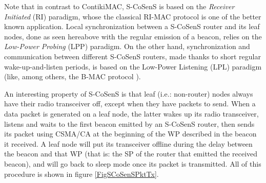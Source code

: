\documentclass[12pt,a4paper]{article}
\begin{document}
Note that in contrast to ContikiMAC, S-CoSenS is based on the \emph{Receiver
Initiated} (RI) paradigm, whose the classical RI-MAC protocol \cite{RIMAC}
is one of the better known application.
Local synchronization between a S-CoSenS router and its leaf nodes, done
as seen hereabove with the regular emission of a beacon, relies on the
\emph{Low-Power Probing} (LPP) paradigm.
On the other hand, synchronization and communication between different
S-CoSenS routers, made thanks to short regular wake-up-and-listen periods,
is based on the Low-Power Listening (LPL) paradigm (like, among others,
the B-MAC protocol \cite{BMAC}).

An interesting property of S-CoSenS is that leaf (i.e.: non-router) nodes
always have their radio transceiver off, except when they have packets
to send. When a data packet is generated on a leaf node, the latter wakes up
its radio transceiver, listens and waits to the first beacon emitted by
an S-CoSenS router, then sends its packet using CSMA/CA at the beginning
of the WP described in the beacon it received. A leaf node will put its
transceiver offline during the delay between the beacon and that WP
(that is: the SP of the router that emitted the received beacon), and
will go back to sleep mode once its packet is transmitted.
All of this procedure is shown in figure \ref{FigSCoSenSPktTx}.
\end{document}

